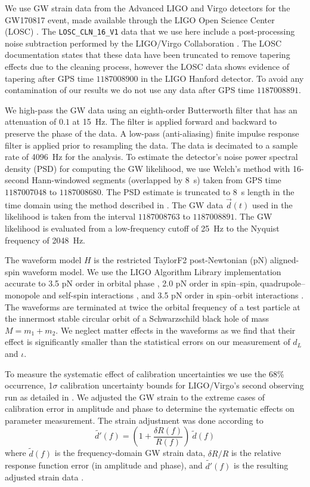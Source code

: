 We use GW strain data from the Advanced LIGO and Virgo detectors for the GW170817 event, made available through the LIGO Open Science Center (LOSC) \cite{Vallisneri:2014vxa}. The \texttt{LOSC\_CLN\_16\_V1} data that we use here include a post-processing noise subtraction performed by the LIGO/Virgo Collaboration \cite{gw170817-losc,gw170817-noise}. The LOSC documentation states that these data have been truncated to remove tapering effects due to the cleaning process, however the LOSC data shows evidence of tapering after GPS time $1187008900$ in the LIGO Hanford detector. To avoid any contamination of our results we do not use any data after GPS time $1187008891$.  

We high-pass the GW data using an eighth-order Butterworth filter that has an attenuation of $0.1$ at 15~Hz. The filter is applied forward and backward to preserve the phase of the data. A low-pass (anti-aliasing) finite impulse response filter is applied prior to resampling the data. The data is decimated to a sample rate of 4096~Hz for the analysis. To estimate the detector's noise power spectral density (PSD) for computing the GW likelihood, we use Welch's method with 16-second Hann-windowed segments (overlapped by 8~s) taken from GPS time $1187007048$ to $1187008680$. The PSD estimate is truncated to 8~s length in the time domain using the method described in \cite{Allen:2005fk}. The GW data $\vec{d}(t)$ used in the likelihood is taken from the interval $1187008763$ to $1187008891$. The GW likelihood is evaluated from a low-frequency cutoff of 25~Hz to the Nyquist frequency of 2048~Hz. 

The waveform model $H$ is the restricted TaylorF2 post-Newtonian (pN) aligned-spin waveform model. We use the LIGO Algorithm Library implementation \cite{lal} accurate to 3.5 pN order in orbital phase \cite{Buonanno:2009zt}, 2.0 pN order in spin--spin, quadrupole--monopole and self-spin interactions \cite{Mikoczi:2005dn,Arun:2008kb}, and 3.5 pN order in spin--orbit interactions \cite{Bohe:2013cla}. The waveforms are terminated at twice the orbital frequency of a test particle at the innermost stable circular orbit of a Schwarzschild black hole of mass $M = m_1 + m_2$. We neglect matter effects in the waveforms as we find that their effect is significantly smaller than the statistical errors on our measurement of $d_L$ and $\iota$. 

To measure the systematic effect of calibration uncertainties we use the 68\% occurrence, 1$\sigma$ calibration uncertainty bounds for LIGO/Virgo's second observing run as detailed in \cite{Cahillane:2017vkb}. We adjusted the GW strain to the extreme cases of calibration error in amplitude and phase to determine the systematic effects on parameter measurement. The strain adjustment was done according to 
\begin{equation}
\tilde{d'}(f) = \left(1+\frac{\delta R(f)}{R(f)}\right) \ \tilde{d}(f)
\end{equation}
where $\tilde{d}(f)$ is the frequency-domain GW strain data, $\delta R/R$ is the relative response function error (in amplitude and phase), and $\tilde{d'}(f)$ is the resulting adjusted strain data \cite{Viets:2017yvy}.

